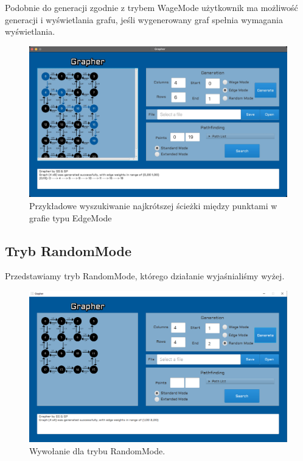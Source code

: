\documentclass[10pt, a4paper]{report}
\begin{document}
Podobnie do generacji zgodnie z trybem WageMode użytkownik ma możliwość
generacji i wyświetlania grafu, jeśli wygenerowany graf spełnia wymagania
wyświetlania.
\newpage

\begin{figure}[h]
  \begin{center}
    \includegraphics[scale=0.165]{grapherEdgeModePathFinding.jpg}
    \caption{Przykładowe wyszukiwanie najkrótszej ścieżki między punktami w
      grafie typu EdgeMode}
  \end{center}
\end{figure}
\newpage

\subsection{Tryb RandomMode}\label{subsec:random-mode}
Przedstawiamy tryb RandomMode, którego działanie wyjaśnialiśmy wyżej.

\begin{figure}[h]
  \begin{center}
    \includegraphics[scale=0.4]{random.png}
    \caption{Wywołanie dla trybu RandomMode.}
  \end{center}
\end{figure}
\end{document}
